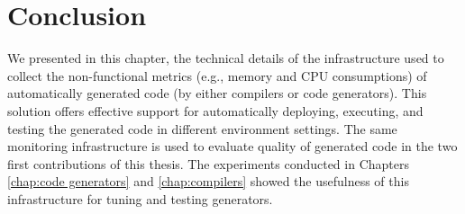 \section{Conclusion}
\label{mon:coclusion}
We presented in this chapter, the technical details of the infrastructure used to collect the non-functional metrics (e.g., memory and CPU consumptions) of automatically generated code (by either compilers or code generators). This solution offers effective support for automatically deploying, executing, and testing the generated code in different environment settings.
The same monitoring infrastructure is used to evaluate quality of generated code in the two first contributions of this thesis. The experiments conducted in Chapters \ref{chap:code generators} and \ref{chap:compilers} showed the usefulness of this infrastructure for tuning and testing generators.